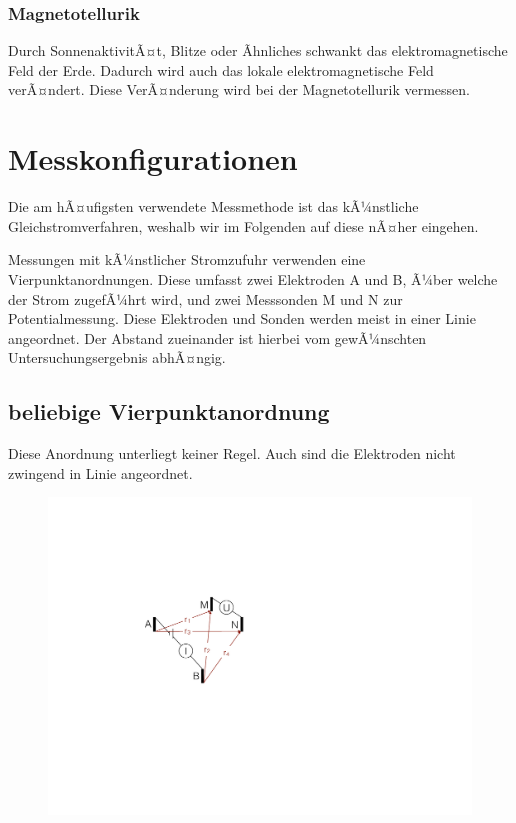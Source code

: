 \subsubsection{Magnetotellurik}
Durch SonnenaktivitÃ¤t, Blitze oder Ãhnliches schwankt das elektromagnetische Feld der Erde. Dadurch wird auch das lokale elektromagnetische Feld verÃ¤ndert. Diese VerÃ¤nderung wird bei der Magnetotellurik vermessen.

\section{Messkonfigurationen}
Die am hÃ¤ufigsten verwendete Messmethode ist das kÃ¼nstliche Gleichstromverfahren, weshalb wir im Folgenden auf diese nÃ¤her eingehen.

Messungen mit kÃ¼nstlicher Stromzufuhr verwenden eine Vierpunktanordnungen. Diese umfasst zwei Elektroden A und B, Ã¼ber welche der Strom zugefÃ¼hrt wird, und zwei Messsonden M und N zur Potentialmessung. Diese Elektroden und Sonden werden meist in einer Linie angeordnet. Der Abstand zueinander ist hierbei vom gewÃ¼nschten Untersuchungsergebnis abhÃ¤ngig.

\subsection{beliebige Vierpunktanordnung}
Diese Anordnung unterliegt keiner Regel. Auch sind die Elektroden nicht zwingend in Linie angeordnet. 

\begin{figure}[H]
	\centering
	\includegraphics[scale = 0.8]{GeoelektrikBilder/beliebigeVierpunktanordnung}
\end{figure}



